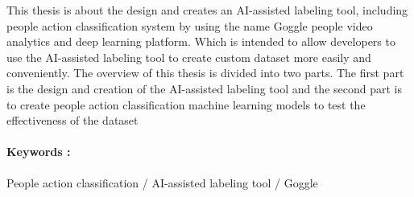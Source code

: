 \begin{abstract_eng}
This thesis is about the design and creates an AI-assisted labeling tool, including people action classification system by using the name 
Goggle people video analytics and deep learning platform. Which is intended to allow developers to use the AI-assisted labeling tool to 
create custom dataset more easily and conveniently. The overview of this thesis is divided into two parts. The first part is the design 
and creation of the AI-assisted labeling tool and the second part is to create people action classification machine learning models to 
test the effectiveness of the dataset
\vfill
\paragraph*{Keywords :} People action classification / AI-assisted labeling tool / Goggle
\vfill
\end{abstract_eng}